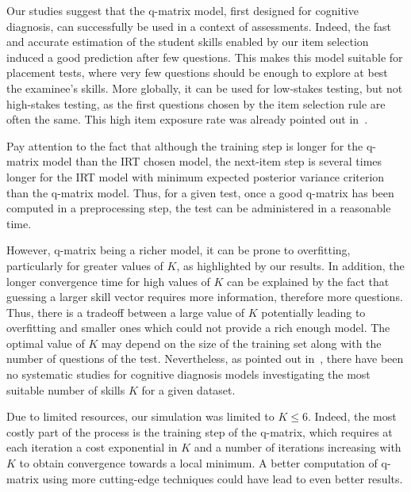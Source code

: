 \documentclass{sig-alternate}
\begin{document}
Our studies suggest that the q-matrix model, first designed for cognitive diagnosis, can successfully be used in a context of assessments. Indeed, the fast and accurate estimation of the student skills enabled by our item selection induced a good prediction after few questions. This makes this model suitable for placement tests, where very few questions should be enough to explore at best the examinee's skills. More globally, it can be used for low-stakes testing, but not high-stakes testing, as the first questions chosen by the item selection rule are often the same. This high item exposure rate was already pointed out in~\citep{Cheng2009}.

Pay attention to the fact that although the training step is longer for the q-matrix model than the IRT chosen model, the next-item step is several times longer for the IRT model with minimum expected posterior variance criterion than the q-matrix model. Thus, for a given test, once a good q-matrix has been computed in a preprocessing step, the test can be administered in a reasonable time. %

However, q-matrix being a richer model, it can be prone to overfitting, particularly for greater values of $K$, as highlighted by our results. In addition, the longer convergence time for high values of $K$ can be explained by the fact that guessing a larger skill vector requires more information, therefore more questions. Thus, there is a tradeoff between a large value of $K$ potentially leading to overfitting and smaller ones which could not provide a rich enough model. The optimal value of $K$ may depend on the size of the training set along with the number of questions of the test. Nevertheless, as pointed out in~\citep{Huebner2010}, there have been no systematic studies for cognitive diagnosis models investigating the most suitable number of skills $K$ for a given dataset.



Due to limited resources, our simulation was limited to $K \leqslant 6$. Indeed, the most costly part of the process is the training step of the q-matrix, which requires at each iteration a cost exponential in $K$ and a number of iterations increasing with $K$ to obtain convergence towards a local minimum. A better computation of q-matrix using more cutting-edge techniques could have lead to even better results.
\end{document}
